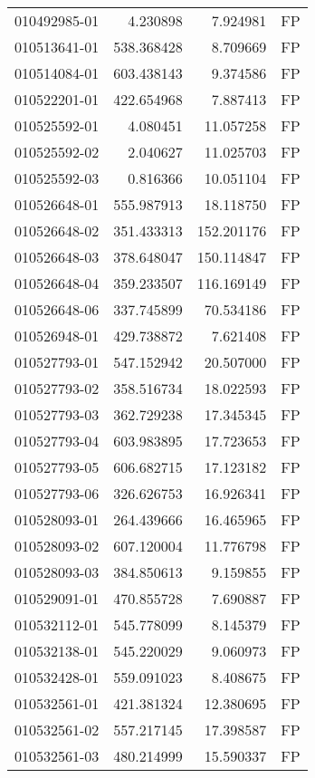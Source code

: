 \begin{tabular}{lrrl}
010492985-01 &    4.230898 &     7.924981 &   FP \\
010513641-01 &  538.368428 &     8.709669 &   FP \\
010514084-01 &  603.438143 &     9.374586 &   FP \\
010522201-01 &  422.654968 &     7.887413 &   FP \\
010525592-01 &    4.080451 &    11.057258 &   FP \\
010525592-02 &    2.040627 &    11.025703 &   FP \\
010525592-03 &    0.816366 &    10.051104 &   FP \\
010526648-01 &  555.987913 &    18.118750 &   FP \\
010526648-02 &  351.433313 &   152.201176 &   FP \\
010526648-03 &  378.648047 &   150.114847 &   FP \\
010526648-04 &  359.233507 &   116.169149 &   FP \\
010526648-06 &  337.745899 &    70.534186 &   FP \\
010526948-01 &  429.738872 &     7.621408 &   FP \\
010527793-01 &  547.152942 &    20.507000 &   FP \\
010527793-02 &  358.516734 &    18.022593 &   FP \\
010527793-03 &  362.729238 &    17.345345 &   FP \\
010527793-04 &  603.983895 &    17.723653 &   FP \\
010527793-05 &  606.682715 &    17.123182 &   FP \\
010527793-06 &  326.626753 &    16.926341 &   FP \\
010528093-01 &  264.439666 &    16.465965 &   FP \\
010528093-02 &  607.120004 &    11.776798 &   FP \\
010528093-03 &  384.850613 &     9.159855 &   FP \\
010529091-01 &  470.855728 &     7.690887 &   FP \\
010532112-01 &  545.778099 &     8.145379 &   FP \\
010532138-01 &  545.220029 &     9.060973 &   FP \\
010532428-01 &  559.091023 &     8.408675 &   FP \\
010532561-01 &  421.381324 &    12.380695 &   FP \\
010532561-02 &  557.217145 &    17.398587 &   FP \\
010532561-03 &  480.214999 &    15.590337 &   FP \\

\end{tabular}
